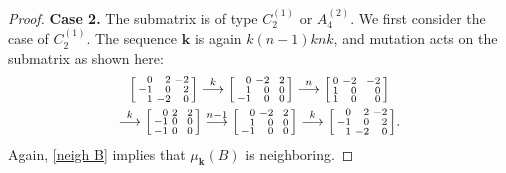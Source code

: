 \documentclass{amsart}
\theoremstyle{definition}
\theoremstyle{remark}
\numberwithin{equation}{section}
\newcommand{\0}{{\mathbf{0}}}
\newcommand{\kk}{{\boldsymbol{k}}}
\begin{document}
\begin{proof}
\noindent
\textbf{Case 2.}
The submatrix is of type $C_2^{(1)}$ or $A_4^{(2)}$.
We first consider the case of $C_2^{(1)}$.
The sequence $\kk$ is again $k(n-1)knk$, and mutation acts on the submatrix as shown here:
\begin{multline*}
\begin{bsmallmatrix*}[r]
0&2&-2\\
-1&0&2\\
1&-2&0
\end{bsmallmatrix*}
\overset{k}{\longrightarrow}
\begin{bsmallmatrix*}[r]
0&-2&\,\,\,2\\
1&0&0\\
-1&0&0
\end{bsmallmatrix*}
\overset{n}{\longrightarrow}
\begin{bsmallmatrix*}[r]
0&-2&\,\,\,-2\\
1&0&0\\
1&0&0
\end{bsmallmatrix*}\\
\overset{k}{\longrightarrow}
\begin{bsmallmatrix*}[r]
0&2&\,\,\,2\\
-1&0&0\\
-1&0&0
\end{bsmallmatrix*}
\overset{n-1}{\longrightarrow}
\begin{bsmallmatrix*}[r]
0&-2&\,\,\,2\\
1&0&0\\
-1&0&0
\end{bsmallmatrix*}
\overset{k}{\longrightarrow}
\begin{bsmallmatrix*}[r]
0&2&-2\\
-1&0&2\\
1&-2&0
\end{bsmallmatrix*}.
\end{multline*}
Again, \cref{neigh B} implies that $\mu_\kk(B)$ is neighboring.


\end{proof}
\end{document}
